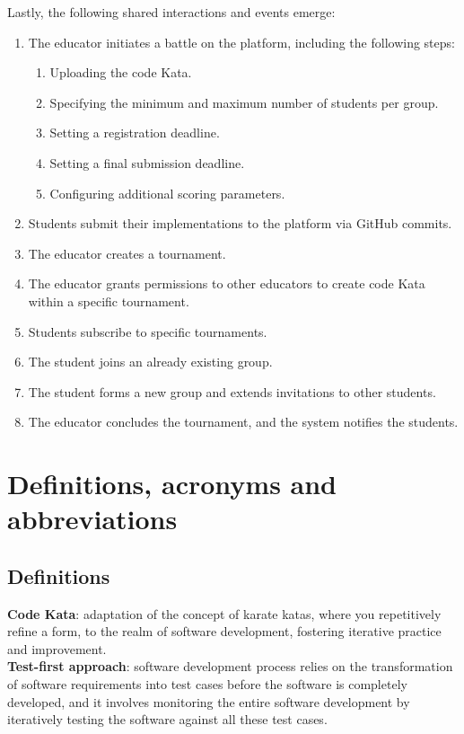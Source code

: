 \documentclass[12pt, a4paper]{report}
\begin{document}
    Lastly, the following shared interactions and events emerge:
    \begin{enumerate}
        \item The educator initiates a battle on the platform, including the following steps:
            \begin{enumerate}
                \item Uploading the code Kata.
                \item Specifying the minimum and maximum number of students per group.
                \item Setting a registration deadline.
                \item Setting a final submission deadline.
                \item Configuring additional scoring parameters.
            \end{enumerate}
        \item Students submit their implementations to the platform via GitHub commits.
        \item The educator creates a tournament.
        \item The educator grants permissions to other educators to create code Kata within a specific tournament.
        \item Students subscribe to specific tournaments.
        \item The student joins an already existing group.
        \item The student forms a new group and extends invitations to other students.
        \item The educator concludes the tournament, and the system notifies the students.
    \end{enumerate}

    
    \section{Definitions, acronyms and abbreviations}
    \subsection{Definitions}
    \textbf{Code Kata}: adaptation of the concept of karate katas, where you repetitively refine a form, to the realm of software development, 
        fostering iterative practice and improvement. 
    \\
    \textbf{Test-first approach}:  software development process relies on the transformation of software requirements into test cases before 
        the software is completely developed, and it involves monitoring the entire software development by iteratively testing the software 
        against all these test cases.
\end{document}
